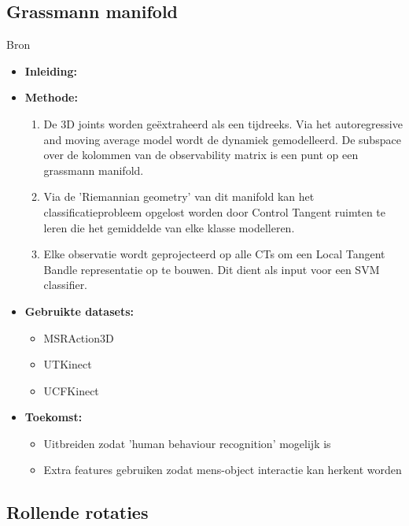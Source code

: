 \subsection{Grassmann manifold}
 Bron \cite{Slama2015}
\begin{itemize}
	\item \textbf{Inleiding:} 
	\item \textbf{Methode:} 
	\begin{enumerate}
		\item De 3D joints worden geëxtraheerd als een tijdreeks. Via het autoregressive and moving average model wordt de dynamiek gemodelleerd. De subspace over de kolommen van de observability matrix is een punt op een grassmann manifold.
		\item Via de 'Riemannian geometry' van dit manifold kan het classificatieprobleem opgelost worden door Control Tangent ruimten te leren die het gemiddelde van elke klasse modelleren.
		
		\item Elke observatie wordt geprojecteerd op alle CTs om een Local Tangent Bandle representatie op te bouwen. Dit dient als input voor een SVM classifier.
	\end{enumerate}
	\item \textbf{Gebruikte datasets:}
	\begin{itemize}
		\item MSRAction3D 
		\item UTKinect
		\item UCFKinect
	\end{itemize}
	\item \textbf{Toekomst:}
	\begin{itemize}
		\item Uitbreiden zodat 'human behaviour recognition' mogelijk is
		\item Extra features gebruiken zodat mens-object interactie kan herkent worden
	\end{itemize}
\end{itemize}

\subsection{Rollende rotaties}

